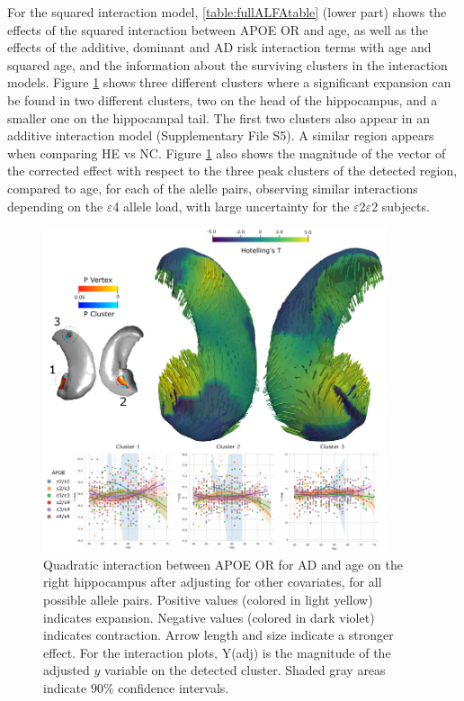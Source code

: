 For the squared interaction model, \ref{table:fullALFAtable} (lower part) shows the effects of the squared interaction between APOE OR and age, as well as the effects of the additive,  dominant and AD risk interaction terms with age and squared age, and the information about the surviving clusters in the interaction models. Figure \ref{fig:alfainteractionfig2} shows three different clusters where a significant expansion can be found in two different clusters, two on the head of the hippocampus, and a smaller one on the hippocampal tail. The first two clusters also appear in an additive interaction model (Supplementary File S5). A similar region appears when comparing HE vs NC. Figure \ref{fig:alfainteractionfig2} also shows the magnitude of the vector of the corrected effect with respect to the three peak clusters of the detected region, compared to age, for each of the alelle pairs, observing similar interactions depending on the $\varepsilon$4 allele load, with large uncertainty for the $\varepsilon$2$\varepsilon$2 subjects. \\

\begin{figure}[htbp]
  \centering
  \includegraphics[width=0.9\textwidth]{figures/hippocampus/fig_interactionapoealfa_OR.pdf}
  \caption[Quadratic interaction between APOE OR for AD and age on the right hippocampus.]{Quadratic interaction between APOE OR for AD and age on the right hippocampus after adjusting for other covariates, for all possible allele pairs. Positive values (colored in light yellow) indicates expansion. Negative values (colored in dark violet) indicates contraction. Arrow length and size indicate a stronger effect. For the interaction plots, Y(adj) is the magnitude of the adjusted $y$ variable on the detected cluster. Shaded gray areas indicate $90\%$ confidence intervals.}\label{fig:alfainteractionfig2}
\end{figure}

